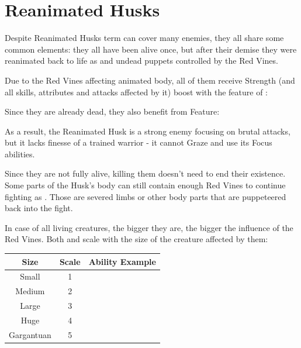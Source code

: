 \section{Reanimated Husks}

Despite Reanimated Husks term can cover many enemies, they all share some common elements: they all have been alive once, but after their demise they were reanimated back to life as and undead puppets controlled by the Red Vines.

Due to the Red Vines affecting animated body, all of them receive Strength (and all skills, attributes and attacks affected by it) boost with the feature of \abilityVinesName{}:

\abilityVines{}

Since they are already dead, they also benefit from \abilityHuskName{} Feature:

\abilityHusk{}

As a result, the Reanimated Husk is a strong enemy focusing on brutal attacks, but it lacks finesse of a trained warrior - it cannot Graze and use its Focus abilities.

Since they are not fully alive, killing them doesn't need to end their existence. Some parts of the Husk's body can still contain enough Red Vines to continue fighting as \enemyReanimatedRemains{}. Those are severed limbs or other body parts that are puppeteered back into the fight.

In case of all living creatures, the bigger they are, the bigger the influence of the Red Vines. Both \abilityVinesName{} and \abilityHuskName{} scale with the size of the creature affected by them: \\

\begin{tabular}{c c c}
	Size 		& Scale & Ability Example \\ \hline
	Small 		& 1 & \abilityVinesName[1] \\
	Medium 		& 2 & \abilityVinesName[2] \\
	Large 		& 3 & \abilityVinesName[3] \\
	Huge 		& 4 & \abilityVinesName[4] \\
	Gargantuan 	& 5 & \abilityVinesName[5] \\
\end{tabular}



